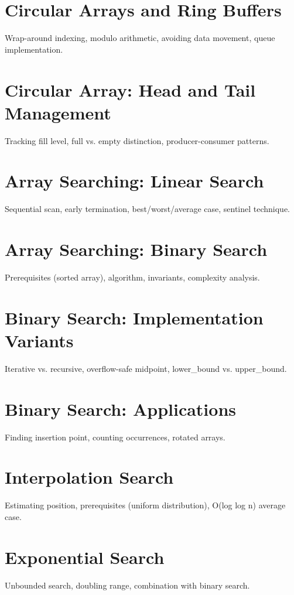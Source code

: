 \chapter{Circular Arrays and Ring Buffers}
Wrap-around indexing, modulo arithmetic, avoiding data movement, queue implementation.

\chapter{Circular Array: Head and Tail Management}
Tracking fill level, full vs. empty distinction, producer-consumer patterns.


\chapter{Array Searching: Linear Search}
Sequential scan, early termination, best/worst/average case, sentinel technique.

\chapter{Array Searching: Binary Search}
Prerequisites (sorted array), algorithm, invariants, complexity analysis.

\chapter{Binary Search: Implementation Variants}
Iterative vs. recursive, overflow-safe midpoint, lower\_bound vs. upper\_bound.

\chapter{Binary Search: Applications}
Finding insertion point, counting occurrences, rotated arrays.

\chapter{Interpolation Search}
Estimating position, prerequisites (uniform distribution), O(log log n) average case.

\chapter{Exponential Search}
Unbounded search, doubling range, combination with binary search.

